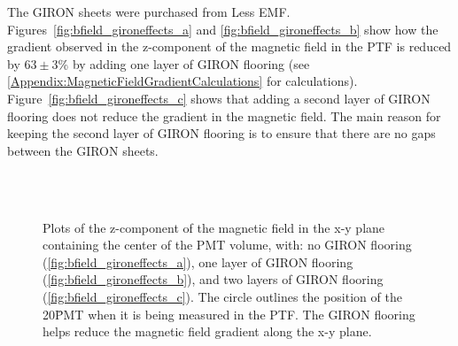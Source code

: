 The GIRON sheets were purchased from Less EMF. Figures~\ref{fig:bfield_gironeffects_a} and \ref{fig:bfield_gironeffects_b} show how the gradient observed in the z-component of the magnetic field in the PTF is reduced by $ 63\pm3 $\% by adding one layer of GIRON flooring (see \ref{Appendix:MagneticFieldGradientCalculations} for calculations).
Figure~\ref{fig:bfield_gironeffects_c} shows that adding a second layer of GIRON flooring does not reduce the gradient in the magnetic field. The main reason for keeping the second layer of GIRON flooring is to ensure that there are no gaps between the GIRON sheets.
%
\begin{figure}[htbp]
  \begin{center}
    \\
    \vspace{-3 mm}
    \\
    \vspace{-3 mm}
  \caption{Plots of the z-component of the magnetic field in the x-y plane containing the center of the PMT volume, with: no GIRON flooring (\ref{fig:bfield_gironeffects_a}), one layer of GIRON flooring (\ref{fig:bfield_gironeffects_b}), and two layers of GIRON flooring (\ref{fig:bfield_gironeffects_c}). The circle outlines the position of the 20\" PMT when it is being measured in the PTF. The GIRON flooring helps reduce the magnetic field gradient along the x-y plane.}
  \label{fig:bfield_gironeffects}
  \end{center}
\end{figure}
%

